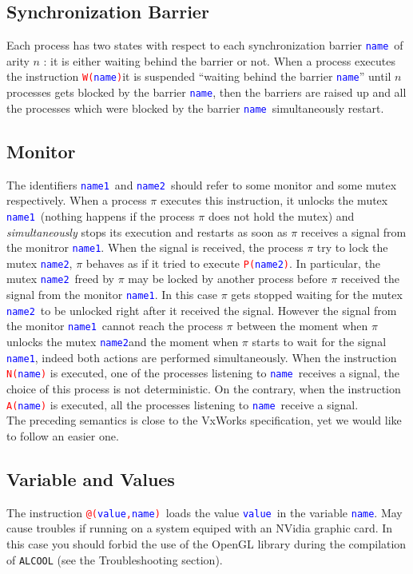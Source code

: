 \documentclass[article,11pt]{amsbook}
\makeatletter
\def\wrn#1{\textcolor{red}{#1}}
\def\hil#1{\textcolor{blue}{#1}}
\def\alcool{\texttt{ALCOOL} }
\def\nvidia{{\sf NVidia} }
\def\vxworks{{\sf VxWorks} }
\def\opengl{{\sf OpenGL} }
\def\name{{\hil{\texttt{\scriptsize name}}}}
\def\namei{{\hil{\texttt{\scriptsize name1}}}}
\def\nameii{{\hil{\texttt{\scriptsize name2}}}}
\def\valpv{{\hil{\texttt{\scriptsize value}}}}
\def\rulecall#1{\hil{{\texttt{#1}}}}
\def\kw#1{\wrn{\texttt{#1}}}
\def\notify#1{{\scriptsize
\kw{N(}\rulecall{{#1}}\kw{)}}}
\def\notifyall#1{{\scriptsize
\kw{A(}\rulecall{{#1}}\kw{)}}}
\def\wait{{\scriptsize
\kw{W(}\rulecall{name}\kw{)}}}
\def\lockmtx#1{{\scriptsize
\kw{P(}\rulecall{{#1}}\kw{)}}}
\def\loadval{{\scriptsize \kw{@(}\rulecall{value}\kw{,}\rulecall{name}\kw{)}}}
\makeatother
\begin{document}
\subsection{Synchronization Barrier}
Each process has two states with respect to each synchronization barrier
\name\ of arity $n$ : it is either waiting behind the barrier or
not. When a process executes the instruction \wait it is suspended
``waiting behind the barrier \name'' until $n$ processes gets blocked by
the barrier \name, then the barriers are raised up and all the processes
which were blocked by the barrier \name\ simultaneously restart.
\subsection{Monitor}
The identifiers \namei\ and \nameii\ should refer to some monitor and
  some mutex respectively. When a process $\pi$ executes this
  instruction, it unlocks the mutex \namei\ (nothing happens if the
  process $\pi$ does not hold the mutex) and {\em simultaneously} stops
  its execution and restarts as soon as $\pi$ receives a signal from the
  monitror \namei. When the signal is received, the process $\pi$ try to
  lock the mutex \nameii, $\pi$ behaves as if it tried to execute
  \lockmtx{name2}. In particular, the mutex \nameii\ freed by $\pi$ may
  be locked by another process before $\pi$ received the signal from the
  monitor \namei. In this case $\pi$ gets stopped waiting for the mutex
  \nameii\ to be unlocked right after it received the signal. However
  the signal from the monitor \namei\ cannot reach the process $\pi$
  between the moment when $\pi$ unlocks the mutex \nameii and the moment
  when $\pi$ starts to wait for the signal \namei, indeed both actions
  are performed simultaneously. When the instruction \notify{\name} is
  executed, one of the processes listening to \name\ receives a signal,
  the choice of this process is not deterministic. On the contrary, when
  the instruction \notifyall{\name} is executed, all the processes
  listening to \name\ receive a signal.\\

The preceding semantics is close to the \vxworks specification, yet we
would like to follow an easier one.
\subsection{Variable and Values} The instruction \loadval\ loads the
value \valpv\ in the variable \name.  May cause troubles if running on a
system equiped with an \nvidia graphic card. In this case you should
forbid the use of the \opengl library during the compilation of \alcool
(see the Troubleshooting section).
\end{document}
